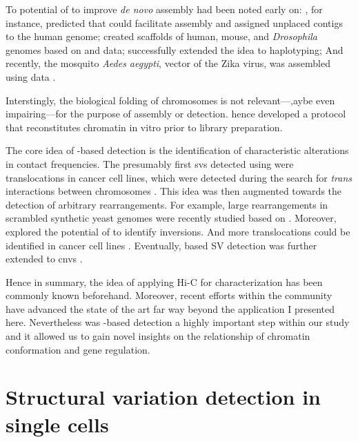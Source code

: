 To potential of \hic to improve \textit{de novo} assembly had been noted early on:
, for instance, predicted that \hic could facilitate assembly
and assigned unplaced contigs to the human genome;  created
scaffolds of human, mouse, and \textit{Drosophila} genomes based on \hic and
\mps data;  successfully extended the idea to haplotyping;
And recently, the mosquito \textit{Aedes aegypti}, vector of the Zika virus, was
assembled using \hic data \citep{Dudchenko2017}.

Interstingly, the biological folding of chromosomes is not relevant---,aybe even
impairing---for the purpose of assembly or \sv detection. \citet{Putnam2016}
hence developed a protocol that reconstitutes chromatin in vitro prior to \hic
library preparation.

The core idea of \hic-based \sv detection is the identification of characteristic
alterations in contact frequencies. The presumably first \acp{sv} detected using
\hic were translocations in cancer cell lines, which were detected during the
search for \textit{trans} interactions between chromosomes \citep{Rickman2012}.
This idea was then augmented towards the detection of arbitrary rearrangements.
For example, large rearrangements in scrambled synthetic yeast genomes were
recently studied based on \hic \citep{Mercy2017}. Moreover, \citet{Putnam2016}
explored the potential of \hic to identify inversions. And more translocations
could be identified in cancer cell lines \citep{Barutcu2015,Ay2015,Harewood2017}.
Eventually, \hic based SV detection was further extended to \acp{cnv}
\citep{Harewood2017,Li2018}.

Hence in summary, the idea of applying Hi-C for \sv characterization has been
commonly known beforehand. Moreover, recent efforts within the community
have advanced the state of the art far way beyond the application I presented
here.  Nevertheless was \hic-based \sv detection a highly important step within
our study and it allowed us to gain novel insights on the relationship of
chromatin conformation and gene regulation.




\section{Structural variation detection in single cells}

